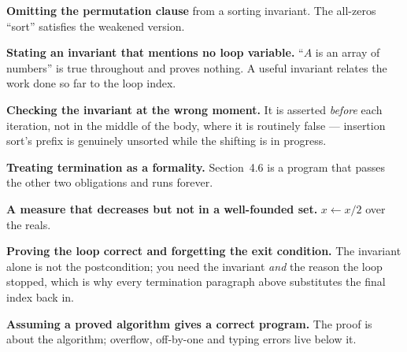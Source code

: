 \begin{pitfall}
\begin{tight}
  \item \textbf{Omitting the permutation clause} from a sorting invariant. The
        all-zeros ``sort'' satisfies the weakened version.
  \item \textbf{Stating an invariant that mentions no loop variable.} ``$A$ is
        an array of numbers'' is true throughout and proves nothing. A useful
        invariant relates the work done so far to the loop index.
  \item \textbf{Checking the invariant at the wrong moment.} It is asserted
        \emph{before} each iteration, not in the middle of the body, where it is
        routinely false --- insertion sort's prefix is genuinely unsorted while
        the shifting is in progress.
  \item \textbf{Treating termination as a formality.} Section~4.6 is a program
        that passes the other two obligations and runs forever.
  \item \textbf{A measure that decreases but not in a well-founded set.}
        $x \gets x/2$ over the reals.
  \item \textbf{Proving the loop correct and forgetting the exit condition.}
        The invariant alone is not the postcondition; you need the invariant
        \emph{and} the reason the loop stopped, which is why every termination
        paragraph above substitutes the final index back in.
  \item \textbf{Assuming a proved algorithm gives a correct program.} The
        proof is about the algorithm; overflow, off-by-one and typing errors
        live below it.
\end{tight}
\end{pitfall}

